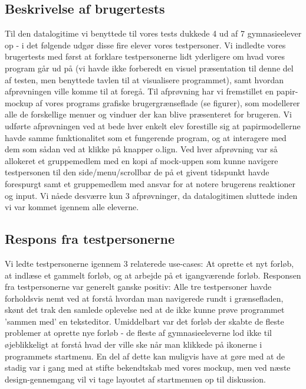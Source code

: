\documentclass[10pt,a4paper,danish]{article}
\begin{document}
\subsection{Beskrivelse af brugertests}
Til den datalogitime vi benyttede til vores tests dukkede 4 ud af 7 gymnasieelever op - i det følgende udgør disse fire elever vores testpersoner. Vi indledte vores brugertests med først at forklare testpersonerne lidt yderligere om hvad vores program går ud på (vi havde ikke forberedt en visuel præsentation til denne del af testen, men benyttede tavlen til at visualisere programmet), samt hvordan afprøvningen ville komme til at foregå. 
\newline
\newline
Til afprøvning har vi fremstillet en papir-mockup af vores programs grafiske brugergrænseflade (se figurer), som modellerer alle de forskellige menuer og vinduer der kan blive præsenteret for brugeren. Vi udførte afprøvningen ved at bede hver enkelt elev forestille sig at papirmodellerne havde samme funktionalitet som et fungerende program, og at interagere med dem som sådan ved at klikke på knapper o.lign. Ved hver afprøvning var så allokeret et gruppemedlem med en kopi af mock-uppen som kunne navigere testpersonen til den side/menu/scrollbar de på et givent tidspunkt havde forespurgt samt et gruppemedlem med ansvar for at notere brugerens reaktioner og input. Vi nåede desværre kun 3 afprøvninger, da datalogitimen sluttede inden vi var kommet igennem alle eleverne.
\subsection{Respons fra testpersonerne}
Vi ledte testpersonerne igennem 3 relaterede use-cases: At oprette et nyt forløb, at indlæse et gammelt forløb, og at arbejde på et igangværende forløb.
Responsen fra testpersonerne var generelt ganske positiv: Alle tre testpersoner havde forholdsvis nemt ved at forstå hvordan man navigerede rundt i grænsefladen, skønt det trak den samlede oplevelse ned at de ikke kunne prøve programmet 'sammen med' en teksteditor. Umiddelbart var det forløb der skabte de fleste problemer at oprette nye forløb - de fleste af gymnasieeleverne lod ikke til øjeblikkeligt at forstå hvad der ville ske når man klikkede på ikonerne i programmets startmenu. En del af dette kan muligvis have at gøre med at de stadig var i gang med at stifte bekendtskab med vores mockup, men ved næste design-gennemgang vil vi tage layoutet af startmenuen op til diskussion. 
\end{document}
